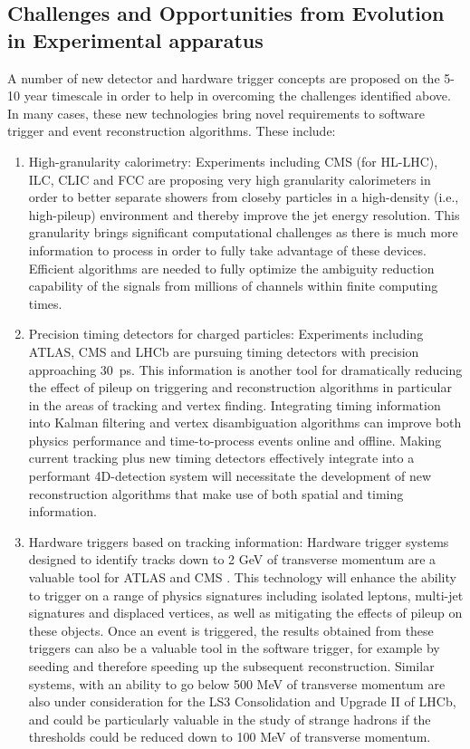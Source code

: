 \subsection{Challenges and Opportunities from Evolution in Experimental apparatus}

A number of new detector and hardware trigger concepts are proposed on the 5-10 year timescale in order to help in overcoming the challenges identified above. In many cases, these new technologies
bring novel requirements to software trigger and event reconstruction algorithms. These include:
\begin{enumerate}
\item
High-granularity calorimetry: Experiments including CMS (for HL-LHC), ILC, CLIC and FCC are proposing very high granularity calorimeters in order to better separate showers from closeby particles in a 
high-density (i.e., high-pileup) environment and thereby improve the jet energy resolution. This granularity brings significant computational challenges as there is much more information to process in 
order to fully take advantage of these devices. Efficient algorithms \cite{Marshall2015,Gray2016} are needed to fully optimize the ambiguity reduction capability of the signals from millions of channels 
within finite computing times. 

\item
Precision timing detectors \cite{Gray2017} for charged particles: Experiments including ATLAS, CMS and LHCb are pursuing timing detectors with precision approaching 30~ps. This information is another tool 
for dramatically reducing the effect of pileup on triggering and reconstruction algorithms in particular in the areas of tracking and vertex finding. Integrating timing information into Kalman filtering 
and vertex disambiguation algorithms can improve both physics performance and time-to-process events online and offline. Making current tracking plus new timing detectors effectively integrate into a 
performant 4D-detection system will necessitate the development of new reconstruction algorithms that make use of both spatial and timing information. 

\item
Hardware triggers based on tracking information: Hardware trigger systems designed to identify tracks down to 2 GeV of transverse momentum are a valuable tool for ATLAS and CMS \cite{ATLAS2015,CMS2015}. This 
technology will enhance the ability to trigger on a range of physics signatures including isolated leptons, multi-jet signatures and displaced vertices, as well as mitigating the effects of pileup 
on these objects. Once an event is triggered, the results obtained from these triggers can also be a valuable tool in the software trigger, for example by seeding and therefore speeding up the 
subsequent reconstruction. Similar systems, with an ability to go below 500 MeV of transverse momentum are also under consideration for the LS3 Consolidation and Upgrade II of LHCb, and could be 
particularly valuable in the study of strange hadrons if the thresholds could be reduced down to 100 MeV of transverse momentum.


\end{enumerate}
